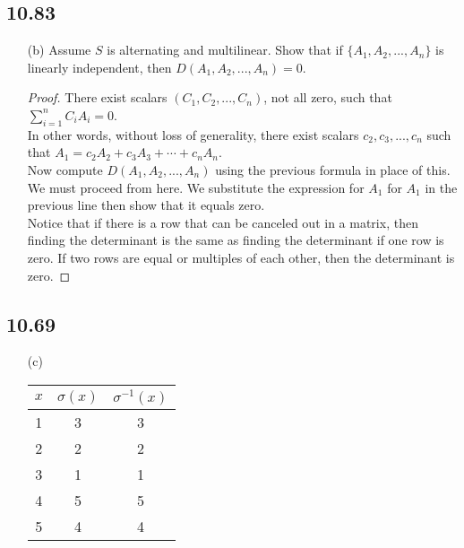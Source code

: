 \documentclass{report}
\theoremstyle{plain}
\theoremstyle{definition}
\theoremstyle{plain}
\begin{document}
\subsection{10.83}
\begin{enumerate}
\item[(b)] Assume $S$ is alternating and multilinear. Show that if $\{A_1,A_2,...,A_n\}$ is linearly independent, then $D(A_1,A_2,...,A_n) = 0$. 
\begin{proof}
There exist scalars $(C_1,C_2,...,C_n)$, not all zero, such that $\sum_{i=1}^nC_iA_i = 0$.\\
In other words, without loss of generality, there exist scalars $c_2,c_3,...,c_n$ such that $A_1=c_2A_2+c_3A_3+\cdots + c_nA_n$.\\
Now compute $D(A_1,A_2,...,A_n)$ using the previous formula in place of this.\\
We must proceed from here. We substitute the expression for $A_1$ for $A_1$ in the previous line then show that it equals zero.\\
Notice that if there is a row that can be canceled out in a matrix, then finding the determinant is the same as finding the determinant if one row is zero. If two rows are equal or multiples of each other, then the determinant is zero.
\end{proof}
\end{enumerate}
\subsection{10.69}
\begin{enumerate}
\item[(c)]
\begin{tabular}{c|c|c}
$x$ & $\sigma(x)$ & $\sigma^{-1}(x)$\\
\hline
1&3&3\\
2&2&2\\
3&1&1\\
4&5&5\\
5&4&4\\
\end{tabular}
\end{enumerate}
\end{document}
